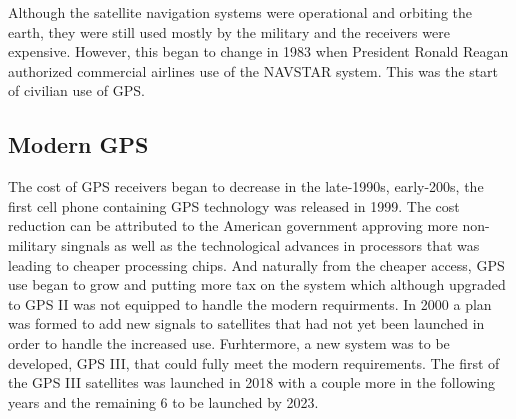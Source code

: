 \vspace{0.6cm} 
Although the satellite navigation systems were operational and orbiting the earth, they were still used mostly by the military and the receivers were expensive. However, this began to change in 1983 when President Ronald Reagan authorized commercial airlines use of the NAVSTAR system. This was the start of civilian use of GPS. \cite{HistGPSProgram}
\par
\vspace{0.6cm} 
\subsection{Modern GPS}
The cost of GPS receivers began to decrease in the late-1990s, early-200s, the first cell phone containing GPS technology was released in 1999. The cost reduction can be attributed to the American government approving more non-military singnals as well as the technological advances in processors that was leading to cheaper processing chips. And naturally from the cheaper access, GPS use began to grow and putting more tax on the system which although upgraded to GPS II was not equipped to handle the modern requirments. In 2000 a plan was formed to add new signals to satellites that had not yet been launched in order to handle the increased use. Furhtermore, a new system was to be developed, GPS III, that could fully meet the modern requirements. The first of the GPS III satellites was launched in 2018 with a couple more in the following years and the remaining 6 to be launched by 2023. \cite{Aerospace2021}
